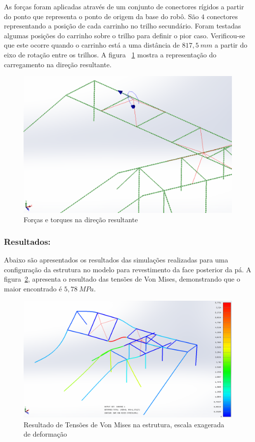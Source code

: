 As forças foram aplicadas através de um conjunto de conectores rígidos a partir
do ponto que representa o ponto de origem da base do robô. São $4$ conectores
representando a posição de cada carrinho no trilho secundário. Foram testadas
algumas posições do carrinho sobre o trilho para definir o pior caso.
Verificou-se que este ocorre quando o carrinho está a uma distância de
$817,5~mm$ a partir do eixo de rotação entre os trilhos. 
A figura ~\ref{fig::carregamento} mostra a representação do carregamento na
direção resultante.

\begin{figure}[H]
	\centering
	\includegraphics[width=0.9\columnwidth]{figs/dimensionamento/carregamento}
	\caption{Forças e torques na direção resultante}
    \label{fig::carregamento}
\end{figure}


\subsubsection{Resultados:}

Abaixo são apresentados os resultados das simulações realizadas para uma
configuração da estrutura no modelo para revestimento da face posterior da pá. A
figura~\ref{fig::von_mises}, apresenta o resultado das tensões de Von Mises,
demonstrando que o maior encontrado é $5,78~MPa$.

\begin{figure}[H]
	\centering
	\includegraphics[width=0.9\columnwidth]{figs/dimensionamento/von_mises}
	\caption{Resultado de Tensões de Von Mises na estrutura, escala exagerada de
	deformação}
    \label{fig::von_mises}
\end{figure}

